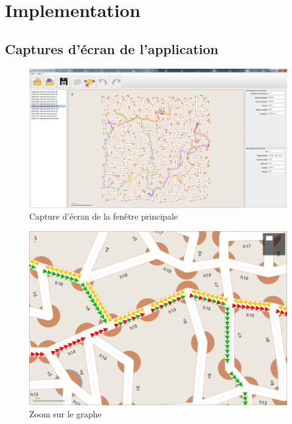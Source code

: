 \chapter{Implementation}

\section{Captures d'écran de l'application}

\begin{figure}[h]
    \centering
    \includegraphics[width=\linewidth]{./images/screenshot1.png}
    \caption{Capture d'écran de la fenêtre principale}
\end{figure}
\pagebreak

\begin{figure}[h]
    \centering
    \includegraphics[width=\linewidth]{./images/screenshot2.png}
    \caption{Zoom sur le graphe}
\end{figure}
\pagebreak

